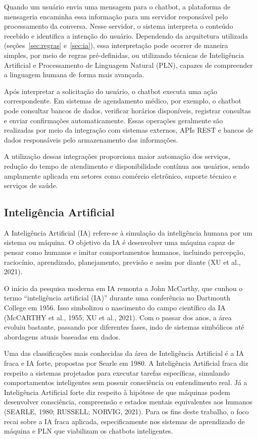 \documentclass[12pt,a4paper]{extarticle}
\begin{document}
Quando um usuário envia uma mensagem para o chatbot, a plataforma de mensageria encaminha essa informação para um servidor responsável pelo processamento da conversa. Nesse servidor, o sistema interpreta o conteúdo recebido e identifica a intenção do usuário. Dependendo da arquitetura utilizada (seções~\ref{sec:regras} e~\ref{sec:ia}), essa interpretação pode ocorrer de maneira simples, por meio de regras pré-definidas, ou utilizando técnicas de Inteligência Artificial e Processamento de Linguagem Natural (PLN), capazes de compreender a linguagem humana de forma mais avançada.

Após interpretar a solicitação do usuário, o chatbot executa uma ação correspondente. Em sistemas de agendamento médico, por exemplo, o chatbot pode consultar bancos de dados, verificar horários disponíveis, registrar consultas e enviar confirmações automaticamente. Essas operações geralmente são realizadas por meio da integração com sistemas externos, APIs REST e bancos de dados responsáveis pelo armazenamento das informações.

A utilização dessas integrações proporciona maior automação dos serviços, redução do tempo de atendimento e disponibilidade contínua aos usuários, sendo amplamente aplicada em setores como comércio eletrônico, suporte técnico e serviços de saúde.
\subsection{Inteligência Artificial}

A Inteligência Artificial (IA) refere-se à simulação da inteligência humana por um sistema ou máquina. O objetivo da IA é desenvolver uma máquina capaz de pensar como humanos e imitar comportamentos humanos, incluindo percepção, raciocínio, aprendizado, planejamento, previsão e assim por diante (XU et al., 2021).

O início da pesquisa moderna em IA remonta a John McCarthy, que cunhou o termo ``inteligência artificial (IA)'' durante uma conferência no Dartmouth College em 1956. Isso simbolizou o nascimento do campo científico da IA (McCARTHY et al., 1955; XU et al., 2021). Com o passar dos anos, a área evoluiu bastante, passando por diferentes fases, indo de sistemas simbólicos até abordagens atuais baseadas em dados.

Uma das classificações mais conhecidas da área de Inteligência Artificial é a IA fraca e IA forte, propostas por Searle em 1980. A Inteligência Artificial fraca diz respeito a sistemas projetados para executar tarefas específicas, simulando comportamentos inteligentes sem possuir consciência ou entendimento real. Já a Inteligência Artificial forte diz respeito à hipótese de que máquinas podem desenvolver consciência, compreensão e estados mentais equivalentes aos humanos (SEARLE, 1980; RUSSELL; NORVIG, 2021). Para os fins deste trabalho, o foco recai sobre a IA fraca aplicada, especificamente nos sistemas de aprendizado de máquina e PLN que viabilizam os chatbots inteligentes.
\end{document}
